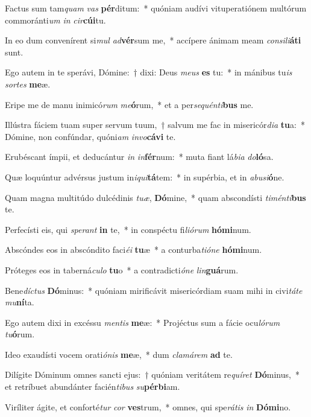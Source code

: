 \item Factus sum tam\textit{quam} \textit{vas} \textbf{pér}ditum:~* quóniam audívi vituperatiónem multórum commoránti\textit{um} \textit{in} \textit{cir}\textbf{cú}\textbf{i}tu.
\item In eo dum convenírent si\textit{mul} \textit{ad}\textbf{vér}sum me,~* accípere ánimam meam \textit{con}\textit{si}\textit{li}\textbf{á}\textbf{ti} sunt.
\item Ego autem in te sperávi, Dómine:~† dixi: Deus \textit{me}\textit{us} \textbf{es} tu:~* in mánibus tu\textit{is} \textit{sor}\textit{tes} \textbf{me}æ.
\item Eripe me de manu inimicó\textit{rum} \textit{me}\textbf{ó}rum,~* et a per\textit{se}\textit{quén}\textit{ti}\textbf{bus} me.
\item Illústra fáciem tuam super servum tuum,~† salvum me fac in misericór\textit{di}\textit{a} \textbf{tu}a:~* Dómine, non confúndar, quóni\textit{am} \textit{in}\textit{vo}\textbf{cá}\textbf{vi} te.
\item Erubéscant ímpii, et deducántur \textit{in} \textit{in}\textbf{fér}num:~* muta fiant lá\textit{bi}\textit{a} \textit{do}\textbf{ló}sa.
\item Quæ loquúntur advérsus justum in\textit{i}\textit{qui}\textbf{tá}tem:~* in supérbia, et in \textit{ab}\textit{u}\textit{si}\textbf{ó}ne.
\item Quam magna multitúdo dulcédinis \textit{tu}\textit{æ}, \textbf{Dó}mine,~* quam abscondísti \textit{ti}\textit{mén}\textit{ti}\textbf{bus} te.
\item Perfecísti eis, qui \textit{spe}\textit{rant} \textbf{in} te,~* in conspéctu fi\textit{li}\textit{ó}\textit{rum} \textbf{hó}\textbf{mi}num.
\item Abscóndes eos in abscóndito faci\textit{é}\textit{i} \textbf{tu}æ~* a conturba\textit{ti}\textit{ó}\textit{ne} \textbf{hó}\textbf{mi}num.
\item Próteges eos in taberná\textit{cu}\textit{lo} \textbf{tu}o~* a contradicti\textit{ó}\textit{ne} \textit{lin}\textbf{guá}rum.
\item Bene\textit{díc}\textit{tus} \textbf{Dó}minus:~* quóniam mirificávit misericórdiam suam mihi in civi\textit{tá}\textit{te} \textit{mu}\textbf{ní}ta.
\item Ego autem dixi in excéssu \textit{men}\textit{tis} \textbf{me}æ:~* Projéctus sum a fácie ocu\textit{ló}\textit{rum} \textit{tu}\textbf{ó}rum.
\item Ideo exaudísti vocem orati\textit{ó}\textit{nis} \textbf{me}æ,~* dum \textit{cla}\textit{má}\textit{rem} \textbf{ad} te.
\item Dilígite Dóminum omnes sancti ejus:~† quóniam veritátem re\textit{quí}\textit{ret} \textbf{Dó}minus,~* et retríbuet abundánter facién\textit{ti}\textit{bus} \textit{su}\textbf{pér}\textbf{bi}am.
\item Viríliter ágite, et conforté\textit{tur} \textit{cor} \textbf{ves}trum,~* omnes, qui spe\textit{rá}\textit{tis} \textit{in} \textbf{Dó}\textbf{mi}no.

